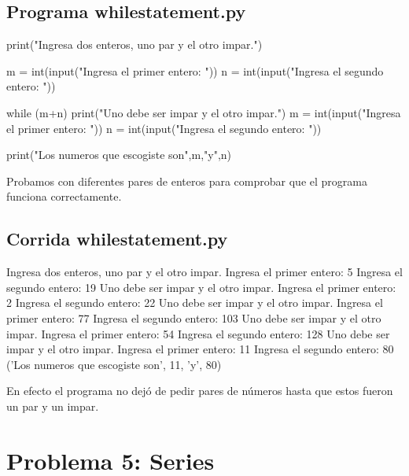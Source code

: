 \documentclass[12pt,spanish]{article}
\begin{document}
\subsection*{Programa whilestatement.py}

\begin{center}
 \begin{boxedverbatim}
  print("Ingresa dos enteros, uno par y el otro impar.")
  
  m = int(input("Ingresa el primer entero: "))
  n = int(input("Ingresa el segundo entero: "))
  
  while (m+n)%
    print("Uno debe ser impar y el otro impar.")
    m = int(input("Ingresa el primer entero: "))
    n = int(input("Ingresa el segundo entero: "))
    
  print("Los numeros que escogiste son",m,"y",n)
 \end{boxedverbatim}
\end{center}

Probamos con diferentes pares de enteros para comprobar que el programa funciona correctamente.

\subsection*{Corrida whilestatement.py}

\begin{center}
 \begin{boxedverbatim}
  Ingresa dos enteros, uno par y el otro impar.
  Ingresa el primer entero: 5
  Ingresa el segundo entero: 19
  Uno debe ser impar y el otro impar.
  Ingresa el primer entero: 2
  Ingresa el segundo entero: 22
  Uno debe ser impar y el otro impar.
  Ingresa el primer entero: 77
  Ingresa el segundo entero: 103
  Uno debe ser impar y el otro impar.
  Ingresa el primer entero: 54
  Ingresa el segundo entero: 128
  Uno debe ser impar y el otro impar.
  Ingresa el primer entero: 11
  Ingresa el segundo entero: 80
  ('Los numeros que escogiste son', 11, 'y', 80)
 \end{boxedverbatim}
\end{center}

En efecto el programa no dejó de pedir pares de números hasta que estos fueron un par y un impar.

\section*{Problema 5: Series}
\end{document}

